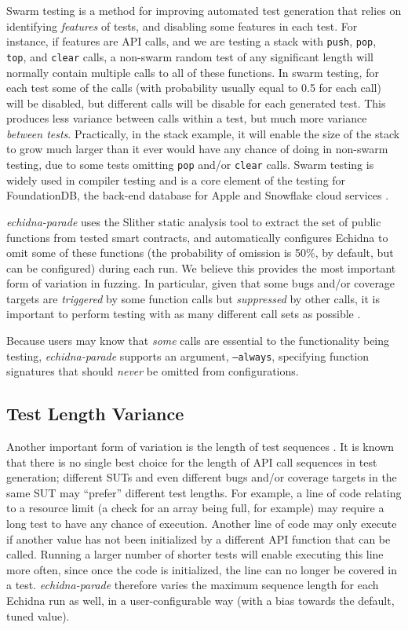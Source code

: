 \documentclass[sigconf]{acmart}
\begin{document}
{Swarm testing \cite{ISSTA12} is a method for improving automated test
generation that relies on identifying \emph{features} of tests, and
disabling some features in each test.  For instance, if features are
API calls, and we are testing a stack with {\tt push}, {\tt pop}, {\tt
  top}, and {\tt clear} calls, a non-swarm random test of any
significant length will normally contain multiple calls to all of
these functions.  In swarm testing, for each test some of the calls
(with probability usually equal to 0.5 for each call) will be
disabled, but different calls will be disable for each generated
test.  This produces less variance between calls within a test, but
much more variance \emph{between tests}.  Practically, in the stack
example, it will enable the size of the stack to grow much larger than
it ever would have any chance of doing in non-swarm testing, due to
some tests omitting {\tt pop} and/or {\tt clear} calls.  Swarm testing
is widely used in compiler testing
\cite{le2014compiler,dewey2015fuzzing} and is a core element of the
testing for FoundationDB, the back-end database for Apple and
Snowflake cloud services \cite{zhou2021foundationdb}.

\emph{echidna-parade} uses the Slither static analysis tool to extract
the set of public functions from tested smart contracts, and
automatically configures Echidna to omit some of these functions
(the probability of omission is 50\%, by default, but can be configured)
during each run.  We believe this provides the most important form of variation
in fuzzing.  In particular, given that some bugs and/or coverage
targets are \emph{triggered} by some function calls but
\emph{suppressed} by other calls, it is important to perform testing
with as many different call sets as possible \cite{groce2013help}.

Because users may know that \emph{some} calls are essential to the functionality being testing, \emph{echidna-parade} supports an argument, {\tt --always}, specifying function signatures that should \emph{never} be omitted from configurations.

\subsection{Test Length Variance}

Another important form of variation is the length of test sequences \cite{ASE08,ArcuriLen}.  It is
known that there is no single best choice for the length of API call
sequences in test generation; different SUTs and even different bugs
and/or coverage targets in the same SUT may ``prefer'' different test
lengths.  For example, a line of code relating to a resource limit (a
check for an array being full, for example) may require a long test to
have any chance of execution.  Another line of code may only execute
if another value has not been initialized by a different API function
that can be called.  Running a larger number of shorter tests will enable executing
this line more often, since once the code is initialized, the line can
no longer be covered in a test.  \emph{echidna-parade} therefore
varies the maximum sequence length for each Echidna run as well, in a
user-configurable way (with a bias towards the default, tuned value).

}
\end{document}
